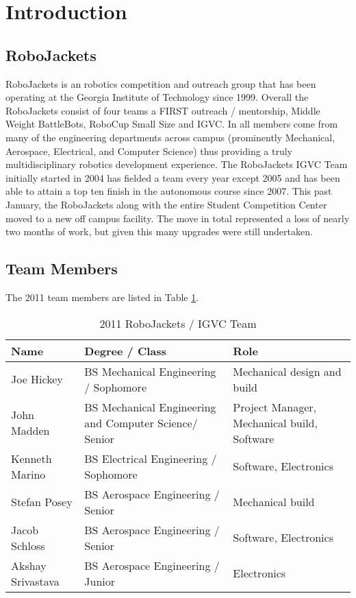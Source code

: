 \section{Introduction}

\subsection{RoboJackets}

RoboJackets is an robotics competition and outreach group that has been operating at the Georgia Institute of Technology since 1999. Overall the RoboJackets consist of four teams a FIRST outreach / mentorship, Middle Weight BattleBots, RoboCup Small Size and IGVC. In all members come from many of the engineering departments across campus (prominently Mechanical, Aerospace, Electrical, and Computer Science) thus providing a truly multidisciplinary robotics development experience. The RoboJackets IGVC Team initially started in 2004 has fielded a team every year except 2005 and has been able to attain a top ten finish in the autonomous course since 2007. This past January, the RoboJackets along with the entire Student Competition Center moved to a new off campus facility. The move in total represented a loss of nearly two months of work, but given this many upgrades were still undertaken. 

\subsection{Team Members}

The 2011 team members are listed in Table \ref{TAB:RJTeam}.

\begin{table}[H]
\begin{center}
\caption{2011 RoboJackets / IGVC Team}
\begin{tabular}{| l | p{2.4in} | p{2in} |}
\hline
Name & Degree / Class & Role\\ \hline
Joe Hickey &		BS Mechanical Engineering / Sophomore&	Mechanical design and build\\ \hline
John Madden &		BS Mechanical Engineering and Computer Science/ Senior & Project Manager, Mechanical build, Software\\ \hline
Kenneth Marino &	BS Electrical Engineering / Sophomore&	Software, Electronics\\ \hline
Stefan Posey &		BS Aerospace Engineering / Senior &		Mechanical build\\ \hline
Jacob Schloss &		BS Aerospace Engineering / Senior&	Software, Electronics\\ \hline
Akshay Srivastava &	BS Aerospace Engineering / Junior&	Electronics\\ \hline

\end{tabular}
\label{TAB:RJTeam}
\end{center}
\end{table}

